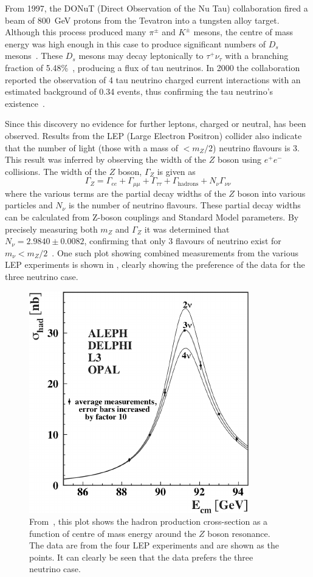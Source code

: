 From 1997, the DONuT (Direct Observation of the Nu Tau) collaboration fired a beam of 800~GeV protons from the Tevatron into a tungsten alloy target.
Although this process produced many $\pi^{\pm}$ and $K^{\pm}$ mesons, the centre of mass energy was high enough in this case to produce significant numbers of $D_{s}$ mesons~\cite{donutFinal}.
These $D_{s}$ mesons may decay leptonically to $\tau^{+}\nu_{\tau}$ with a branching fraction of 5.48\%~\cite{pdg2020}, producing a flux of tau neutrinos.
In 2000 the collaboration reported the observation of 4 tau neutrino charged current interactions with an estimated background of 0.34 events, thus confirming the tau neutrino's existence~\cite{tauNeutrino}.  

Since this discovery no evidence for further leptons, charged or neutral, has been observed.
Results from the LEP (Large Electron Positron) collider also indicate that the number of light (those with a mass of $<m_{Z}/2$) neutrino flavours is 3.
This result was inferred by observing the width of the $Z$ boson using $e^{+}e^{-}$ collisions.
The width of the $Z$ boson, $\Gamma_{Z}$ is given as
\begin{equation}
  \Gamma_{Z} = \Gamma_{ee} + \Gamma_{\mu\mu} + \Gamma_{\tau\tau} + \Gamma_{\text{hadrons}} + N_{\nu}\Gamma_{\nu\nu}
\end{equation}
where the various terms are the partial decay widths of the $Z$ boson into various particles and $N_{\nu}$ is the number of neutrino flavours.
These partial decay widths can be calculated from Z-boson couplings and Standard Model parameters.
By precisely measuring both $m_{Z}$ and $\Gamma_{Z}$ it was determined that $N_{\nu} = 2.9840 \pm 0.0082$, confirming that only 3 flavours of neutrino exist for $m_{\nu} < m_{Z}/2$~\cite{zBosonWidth}.
One such plot showing combined measurements from the various LEP experiments is shown in , clearly showing the preference of the data for the three neutrino case.

\begin{figure}[h]
  \centering
  \includegraphics[width=.5\linewidth]{files/figures/theory/zBosonWidth}
  \caption[Hadron production cross-section around $Z$ boson resonance.]{From~\cite{zBosonWidth}, this plot shows the hadron production cross-section as a function of centre of mass energy around the $Z$ boson resonance. The data are from the four LEP experiments and are shown as the points. It can clearly be seen that the data prefers the three neutrino case.}
  \label{fig:zBosonWidth}
\end{figure}

